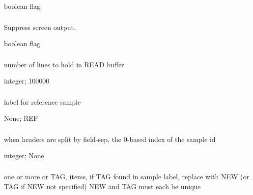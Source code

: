 \documentclass[letterpaper,11pt,english]{sphinxmanual}
\begin{document}
 boolean flag


\subsubsection{}
\label{\detokenize{prog_desc:id5}}
 Suppress screen output.

 boolean flag


\subsubsection{}
\label{\detokenize{prog_desc:read-buffer-readbuffer}}
 number of lines to hold in READ buffer

 integer;  100000


\subsubsection{}
\label{\detokenize{prog_desc:ref-label-reflabel}}
 label for reference sample

 None;  REF


\subsubsection{}
\label{\detokenize{prog_desc:sample-field-samplefield}}
 when headers are split by \textendash{}field-sep, the 0-based index of the sample id

 integer;  None


\subsubsection{}
\label{\detokenize{prog_desc:sample-replace-samplereplace}}
 one or more  or TAG, items, if TAG found in sample label, replace with NEW (or TAG if NEW not specified) NEW and TAG must each be unique
\end{document}
